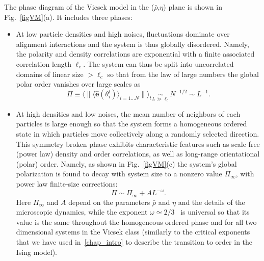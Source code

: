 The phase diagram of the Vicsek model in the ($\bar{\rho}$,$\eta$) plane is shown in Fig.~\ref{figVM}(a). It includes three phases:
\begin{itemize}
\item At low particle densities and high noises, fluctuations dominate over alignment interactions and the system is thus globally disordered. 
Namely, the polarity and density correlations are exponential with a finite associated correlation length $\ell_c$. 
The system can thus be split into uncorrelated domains of linear size $> \ell_c$ so that from the law of large numbers the global polar order vanishes over large scales as
\begin{equation}
\Pi \equiv \langle \|\langle \hat{\bm e}(\theta_i^{t}) \rangle_{i=1\ldots N}\|\rangle_t \underset{L \gg \ell_c}{\sim} N^{-1/2} \sim L^{-1} .
\end{equation} 
\item At high densities and low noises, the mean number of neighbors of each particles is large enough so that the system forms 
a homogeneous ordered state in which particles move collectively along a randomly selected direction. 
This symmetry broken phase exhibits characteristic features such as scale free (power law) density and order correlations, 
as well as long-range orientational (polar) order.
Namely, as shown in Fig.~\ref{figVM}(c) the system's global polarization is found to decay with system size to a nonzero value $\Pi_\infty$, with power law finite-size corrections:
\begin{equation}
\label{eq_LRO}
\Pi \sim \Pi_{\infty} + A L^{-\omega} .
\end{equation} 
Here $\Pi_\infty$ and $A$ depend on the parameters $\bar{\rho}$ and $\eta$ and the details of the microscopic dynamics, 
while the exponent $\omega \simeq 2/3$~\cite{chate2020dry} is universal so that its value is the same throughout the homogeneous ordered phase and for all two dimensional systems in the Vicsek class (similarly to the critical exponents that we have used in~\autoref{chap_intro} to describe the transition to order in the Ising model).


\end{itemize}
